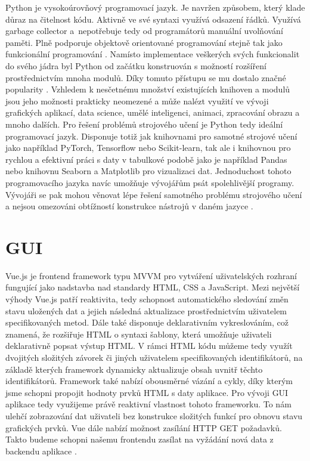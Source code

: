 Python je vysokoúrovňový programovací jazyk. 
Je navržen způsobem, který klade důraz na čitelnost kódu. 
Aktivně ve své syntaxi využívá odsazení řádků. 
Využívá garbage collector a~nepotřebuje tedy od programátorů manuální uvolňování paměti. 
Plně podporuje objektově orientované programování stejně tak jako funkcionální programování \cite{python-book}. 
Namísto implementace veškerých svých funkcionalit do svého jádra byl Python od začátku konstruován s možností rozšíření prostřednictvím mnoha modulů. 
Díky tomuto přístupu se mu dostalo značné popularity \cite{making-of-python}. 
Vzhledem k nesčetnému množství existujících knihoven a modulů jsou jeho možnosti prakticky neomezené a může nalézt využití ve vývoji grafických aplikací, data science, umělé inteligenci, animaci, zpracování obrazu a mnoho dalších.
Pro řešení problémů strojového učení je Python tedy ideální programovací jazyk. 
Disponuje totiž jak knihovnami pro samotné strojové učení jako například PyTorch, Tensorflow nebo Scikit-learn, tak ale i knihovnou pro rychlou a efektivní práci s daty v tabulkové podobě jako je například Pandas nebo knihovnu Seaborn a Matplotlib pro vizualizaci dat. 
Jednoduchost tohoto programovacího jazyka navíc umožňuje vývojářům psát spolehlivější programy. 
Vývojáři se pak mohou věnovat lépe řešení samotného problému strojového učení a nejsou omezováni obtížností konstrukce nástrojů v daném jazyce \cite{why-use-python}.

\section{GUI}

Vue.js je frontend framework typu MVVM pro vytváření uživatelských rozhraní fungující jako nadstavba nad standardy HTML, CSS a JavaScript. 
Mezi největší výhody Vue.js patří reaktivita, tedy schopnost automatického sledování změn stavu uložených dat a jejich následná aktualizace prostřednictvím uživatelem specifikovaných metod. 
Dále také disponuje deklarativním vykreslováním, což znamená, že rozšiřuje HTML o syntaxi šablony, která umožňuje uživateli deklarativně popsat výstup HTML. 
V rámci HTML kódu můžeme tedy využít dvojitých složitých závorek či jiných uživatelem specifikovaných identifikátorů, na základě kterých framework dynamicky aktualizuje obsah uvnitř těchto identifikátorů. 
Framework také nabízí obousměrné vázání a cykly, díky kterým jsme schopni propojit hodnoty prvků HTML s daty aplikace. 
Pro vývoji GUI aplikace tedy využijeme právě reaktivní vlastnost tohoto frameworku. 
To nám ulehčí zobrazování dat uživateli bez konstrukce složitých funkcí pro obnovu stavu grafických prvků. 
Vue dále nabízí možnost zasílání HTTP GET požadavků. 
Takto budeme schopni našemu frontendu zasílat na vyžádání nová data z backendu aplikace \cite{vue:1, vue:2, vue:3}.

